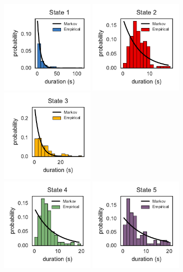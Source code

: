 \documentclass{article}
\begin{document}
\begin{figure}[h]
\centering%
\includegraphics[width=1.8in]{figures/arhmm/durations_0.pdf}
\includegraphics[width=1.8in]{figures/arhmm/durations_1.pdf}
\includegraphics[width=1.8in]{figures/arhmm/durations_2.pdf}
\\
\includegraphics[width=1.8in]{figures/arhmm/durations_3.pdf}
\includegraphics[width=1.8in]{figures/arhmm/durations_4.pdf}

\end{figure}
\end{document}
